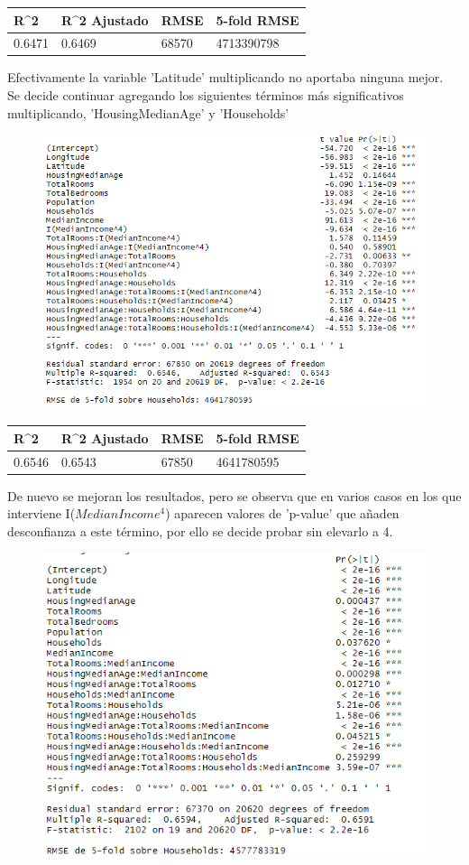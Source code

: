 \begin{table}[!h]
	\centering
	\begin{tabular}{llll}
		R\textasciicircum{}2 & R\textasciicircum{}2 Ajustado & RMSE  & 5-fold RMSE \\ \hline
		0.6471               & 0.6469                        & 68570 & 4713390798 
	\end{tabular}
\end{table}

Efectivamente la variable 'Latitude' multiplicando no aportaba ninguna mejor.\\

Se decide continuar agregando los siguientes términos más significativos multiplicando, 'HousingMedianAge' y 'Households'
\begin{figure}[!h]
	\centering
	\includegraphics[width=0.7\linewidth]{figures/fit_multi_9}
	\caption{}
	\label{fig:fitmulti9}
\end{figure}

\begin{table}[!h]
	\centering
	\begin{tabular}{llll}
		R\textasciicircum{}2 & R\textasciicircum{}2 Ajustado & RMSE  & 5-fold RMSE \\ \hline
		0.6546               & 0.6543                        & 67850 & 4641780595 
	\end{tabular}
\end{table}

De nuevo se mejoran los resultados, pero se observa que en varios casos en los que interviene I($MedianIncome ^{4} $) aparecen valores de 'p-value' que añaden desconfianza a este término, por ello se decide probar sin elevarlo a 4.
\begin{figure}[!h]
	\centering
	\includegraphics[width=0.7\linewidth]{figures/fit_multi_10}
	\caption{}
	\label{fig:fitmulti10}
\end{figure}

